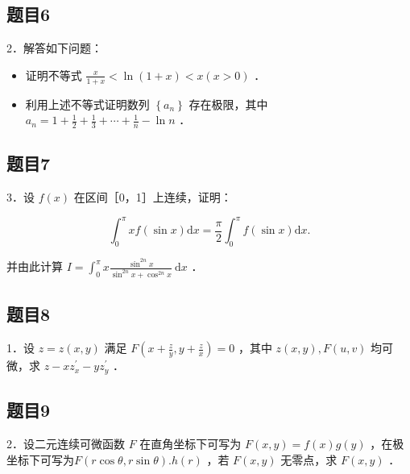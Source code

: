 \documentclass{article}
\begin{document}
\subsection{题目6}
2．解答如下问题：

\begin{itemize}
  \item[（1）] 证明不等式 \(\frac{x}{1+x}<\ln (1+x)<x(x>0)\) ．
  \item[（2）] 利用上述不等式证明数列 \(\left\{a_{n}\right\}\) 存在极限，其中 \(a_{n}=1+\frac{1}{2}+\frac{1}{3}+\cdots+\frac{1}{n}-\ln n\) ．
\end{itemize}

\subsection{题目7}
3．设 \(f(x)\) 在区间［0，1］上连续，证明：

\[
\int_{0}^{\pi} x f(\sin x) \mathrm{d} x=\frac{\pi}{2} \int_{0}^{\pi} f(\sin x) \mathrm{d} x .
\]

并由此计算 \(I=\int_{0}^{\pi} x \frac{\sin ^{2 n} x}{\sin ^{2 n} x+\cos ^{2 n} x} \mathrm{~d} x\) ．

\subsection{题目8}
1．设 \(z=z(x, y)\) 满足 \(F\left(x+\frac{z}{y}, y+\frac{z}{x}\right)=0\) ，其中 \(z(x, y), F(u, v)\) 均可微，求 \(z-x z_{x}^{\prime}-y z_{y}^{\prime}\) ．

\subsection{题目9}
2．设二元连续可微函数 \(F\) 在直角坐标下可写为 \(F(x, y)=f(x) g(y)\) ，在极坐标下可写为\(F(r \cos \theta, r \sin \theta) . h(r)\) ，若 \(F(x, y)\) 无零点，求 \(F(x, y)\) ．
\end{document}
